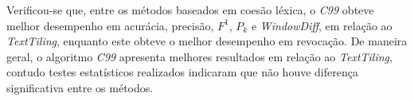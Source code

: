 


Verificou-se que, entre os métodos baseados em coesão léxica, o \textit{C99} obteve melhor desempenho em acurácia, precisão, $F^1$, $P_k$ e \textit{WindowDiff}, em relação ao \textit{TextTiling}, enquanto este obteve o melhor desempenho em revocação. De maneira geral, o algoritmo \textit{C99} apresenta melhores resultados em relação ao \textit{TextTiling}, contudo testes estatísticos realizados indicaram que não houve diferença significativa entre os métodos. 











